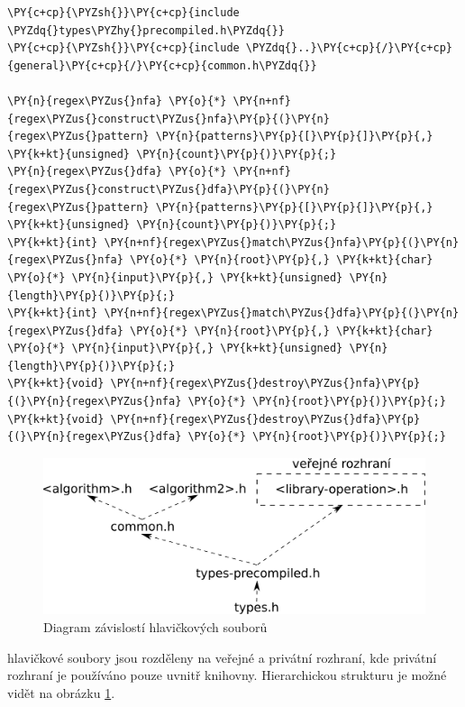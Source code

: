 \begin{Verbatim}[commandchars=\\\{\}]
\PY{c+cp}{\PYZsh{}}\PY{c+cp}{include \PYZdq{}types\PYZhy{}precompiled.h\PYZdq{}}
\PY{c+cp}{\PYZsh{}}\PY{c+cp}{include \PYZdq{}..}\PY{c+cp}{/}\PY{c+cp}{general}\PY{c+cp}{/}\PY{c+cp}{common.h\PYZdq{}}

\PY{n}{regex\PYZus{}nfa} \PY{o}{*} \PY{n+nf}{regex\PYZus{}construct\PYZus{}nfa}\PY{p}{(}\PY{n}{regex\PYZus{}pattern} \PY{n}{patterns}\PY{p}{[}\PY{p}{]}\PY{p}{,} \PY{k+kt}{unsigned} \PY{n}{count}\PY{p}{)}\PY{p}{;}
\PY{n}{regex\PYZus{}dfa} \PY{o}{*} \PY{n+nf}{regex\PYZus{}construct\PYZus{}dfa}\PY{p}{(}\PY{n}{regex\PYZus{}pattern} \PY{n}{patterns}\PY{p}{[}\PY{p}{]}\PY{p}{,} \PY{k+kt}{unsigned} \PY{n}{count}\PY{p}{)}\PY{p}{;}
\PY{k+kt}{int} \PY{n+nf}{regex\PYZus{}match\PYZus{}nfa}\PY{p}{(}\PY{n}{regex\PYZus{}nfa} \PY{o}{*} \PY{n}{root}\PY{p}{,} \PY{k+kt}{char} \PY{o}{*} \PY{n}{input}\PY{p}{,} \PY{k+kt}{unsigned} \PY{n}{length}\PY{p}{)}\PY{p}{;}
\PY{k+kt}{int} \PY{n+nf}{regex\PYZus{}match\PYZus{}dfa}\PY{p}{(}\PY{n}{regex\PYZus{}dfa} \PY{o}{*} \PY{n}{root}\PY{p}{,} \PY{k+kt}{char} \PY{o}{*} \PY{n}{input}\PY{p}{,} \PY{k+kt}{unsigned} \PY{n}{length}\PY{p}{)}\PY{p}{;}
\PY{k+kt}{void} \PY{n+nf}{regex\PYZus{}destroy\PYZus{}nfa}\PY{p}{(}\PY{n}{regex\PYZus{}nfa} \PY{o}{*} \PY{n}{root}\PY{p}{)}\PY{p}{;}
\PY{k+kt}{void} \PY{n+nf}{regex\PYZus{}destroy\PYZus{}dfa}\PY{p}{(}\PY{n}{regex\PYZus{}dfa} \PY{o}{*} \PY{n}{root}\PY{p}{)}\PY{p}{;}
\end{Verbatim}


\begin{figure}[!htb]
\centering
\includegraphics[scale=.25]{fig/header-dependencies.pdf}
\caption{Diagram závislostí hlavičkových souborů}
\label{fig:header-dependecies}
\end{figure}

hlavičkové soubory jsou rozděleny na veřejné a privátní rozhraní, kde privátní rozhraní je používáno pouze uvnitř knihovny. Hierarchickou strukturu je možné vidět na obrázku \ref{fig:header-dependecies}.

